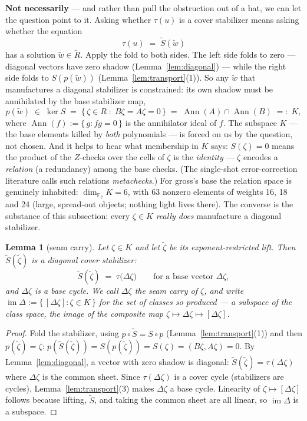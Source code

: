\documentclass[11pt]{article}
\theoremstyle{plain}
\newtheorem{lemma}[theorem]{Lemma}
\theoremstyle{definition}
\theoremstyle{remark}
\newcommand{\F}{\mathbb{F}}
\newcommand{\Ann}{\operatorname{Ann}}
\newcommand{\imD}{\operatorname{im}\Delta}
\newcommand{\Rbase}{R}
\newcommand{\Rcov}{\widetilde{R}}
\begin{document}
\textbf{Not necessarily} --- and rather than pull the obstruction out of a
hat, we can let the question point to it. Asking whether $\tau(u)$ is a
cover stabilizer means asking whether the equation
\[
\tau(u) \;=\; \widetilde S(\widetilde w)
\]
has a solution $\widetilde w \in \Rcov$. Apply the fold to both sides. The
left side folds to zero --- diagonal vectors have zero shadow
(Lemma~\ref{lem:diagonal}) --- while the right side folds to
$S(p(\widetilde w))$ (Lemma~\ref{lem:transport}(1)). So any $\widetilde w$
that manufactures a diagonal stabilizer is constrained: its own shadow must
be annihilated by the base stabilizer map,
\[
p(\widetilde w) \;\in\; \ker S
\;=\; \{\, \zeta \in \Rbase \;:\; B\zeta = A\zeta = 0 \,\}
\;=\; \Ann(A) \cap \Ann(B) \;=:\; K,
\]
where $\Ann(f) := \{\, g : f g = 0 \,\}$ is the annihilator ideal of $f$.
The subspace $K$ --- the base elements killed by \emph{both} polynomials ---
is forced on us by the question, not chosen. And it helps to hear what
membership in $K$ says: $S(\zeta) = 0$ means the product of the $Z$-checks
over the cells of $\zeta$ is the \emph{identity} --- $\zeta$ encodes a
\emph{relation} (a redundancy) among the base checks. (The single-shot
error-correction literature calls such relations \emph{metachecks}.) For
gross's base the relation space is genuinely inhabited: $\dim_{\F_2} K = 6$,
with $63$ nonzero elements of weights 16, 18 and 24 (large, spread-out
objects; nothing light lives there). The converse is the substance of this
subsection: every $\zeta \in K$ \emph{really does} manufacture a diagonal
stabilizer.

\begin{lemma}[seam carry]\label{lem:seamcarry}
Let $\zeta \in K$ and let $\widetilde\zeta$ be its exponent-restricted lift.
Then $\widetilde S(\widetilde \zeta)$ is a \emph{diagonal} cover stabilizer:
\[
\widetilde S(\widetilde\zeta) \;=\; \tau\bigl(\Delta\zeta\bigr)
\qquad\text{for a base vector } \Delta\zeta,
\]
and $\Delta\zeta$ is a base \emph{cycle}. We call $\Delta\zeta$ the
\emph{seam carry} of $\zeta$, and write
$\imD := \{\, [\Delta\zeta] : \zeta \in K \,\}$ for the set of classes so
produced --- a subspace of the class space, the image of the composite map
$\zeta \mapsto \Delta\zeta \mapsto [\Delta\zeta]$.
\end{lemma}

\begin{proof}
Fold the stabilizer, using $p \circ \widetilde S = S \circ p$
(Lemma~\ref{lem:transport}(1)) and then $p(\widetilde\zeta) = \zeta$:
$p(\widetilde S(\widetilde\zeta)) = S(p(\widetilde\zeta))
= S(\zeta) = (B\zeta, A\zeta) = 0$. By Lemma~\ref{lem:diagonal}, a vector with
zero shadow is diagonal: $\widetilde S(\widetilde\zeta) = \tau(\Delta\zeta)$
where $\Delta\zeta$ is the common sheet. Since $\tau(\Delta\zeta)$ is a cover
cycle (stabilizers are cycles), Lemma~\ref{lem:transport}(3) makes
$\Delta\zeta$ a base cycle. Linearity of $\zeta \mapsto [\Delta\zeta]$ follows
because lifting, $\widetilde S$, and taking the common sheet are all linear,
so $\imD$ is a subspace.
\end{proof}
\end{document}

